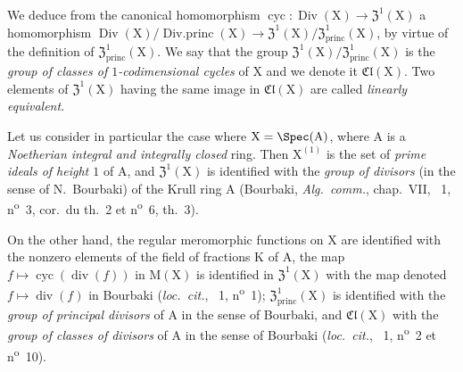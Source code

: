 \begin{env}[21.6.7]
We deduce from the canonical homomorphism $\operatorname{cyc}:\operatorname{Div}(\mathrm{X})\to\mathfrak{Z}^1(\mathrm{X})$ a homomorphism $\operatorname{Div}(\mathrm{X})/\operatorname{Div.princ}(\mathrm{X})\to\mathfrak{Z}^1(\mathrm{X})/\mathfrak{Z}^1_\mathrm{princ}(\mathrm{X})$, by virtue of the definition of $\mathfrak{Z}^1_\mathrm{princ}(\mathrm{X})$.
We say that the group $\mathfrak{Z}^1(\mathrm{X})/\mathfrak{Z}^1_\mathrm{princ}(\mathrm{X})$ is the \emph{group of classes of $1$-codimensional cycles} of $\mathrm{X}$ and we denote it $\mathfrak{Cl}(\mathrm{X})$.
Two elements of $\mathfrak{Z}^1(\mathrm{X})$ having the same image in $\mathfrak{Cl}(\mathrm{X})$ are called \emph{linearly equivalent}.
\end{env}

\begin{env}[21.6.8]
\label{IV.21.6.8}
Let us consider in particular the case where $\mathrm{X}=\Spec(\mathrm{A})$, where $\mathrm{A}$ is a \emph{Noetherian integral and integrally closed} ring.
Then $\mathrm{X}^{(1)}$ is the set of \emph{prime ideals of height $1$} of $\mathrm{A}$, and $\mathfrak{Z}^1(\mathrm{X})$ is identified with the \emph{group of divisors} (in the sense of N.~Bourbaki) of the Krull ring $\mathrm{A}$ (Bourbaki, \emph{Alg.\ comm.}, chap.~VII, \textsection~1, n\textsuperscript{o}~3, cor.\ du th.~2 et n\textsuperscript{o}~6, th.~3).

On the other hand, the regular meromorphic functions on $\mathrm{X}$ are identified with the nonzero elements of the field of fractions $\mathrm{K}$ of $\mathrm{A}$, the map $f\mapsto\operatorname{cyc}(\operatorname{div}(f))$ in $\mathrm{M}(\mathrm{X})$ is identified in $\mathfrak{Z}^1(\mathrm{X})$ with the map denoted $f\mapsto\operatorname{div}(f)$ in Bourbaki (\emph{loc.\ cit.}, \textsection~1, n\textsuperscript{o}~1);
$\mathfrak{Z}^1_\mathrm{princ}(\mathrm{X})$ is identified with the \emph{group of principal divisors} of $\mathrm{A}$ in the sense of Bourbaki, and $\mathfrak{Cl}(\mathrm{X})$ with the \emph{group of classes of divisors} of $\mathrm{A}$ in the sense of Bourbaki (\emph{loc.\ cit.}, \textsection~1, n\textsuperscript{o}~2 et n\textsuperscript{o}~10).
\end{env}

